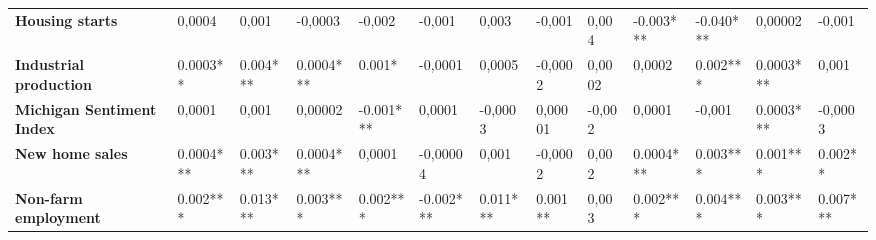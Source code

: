 \begin{landscape}
\begin{table}[]
{\begin{tabular}{@{}lllllllllllll@{}}
\textbf{Housing starts}           & 0,0004                                & 0,001                                 & -0,0003                               & -0,002                                & -0,001                                & 0,003                                 & -0,001                                & 0,004                                 & -0.003***                             & -0.040***                             & 0,00002                               & -0,001                                \\
\textbf{Industrial production}    & 0.0003**                              & 0.004***                              & 0.0004***                             & 0.001*                                & -0,0001                               & 0,0005                                & -0,0002                               & 0,0002                                & 0,0002                                & 0.002***                              & 0.0003***                             & 0,001                                 \\
\textbf{Michigan Sentiment Index} & 0,0001                                & 0,001                                 & 0,00002                               & -0.001***                             & 0,0001                                & -0,0003                               & 0,00001                               & -0,002                                & 0,0001                                & -0,001                                & 0.0003***                             & -0,0003                               \\
\textbf{New home sales}           & 0.0004***                             & 0.003***                              & 0.0004***                             & 0,0001                                & -0,00004                              & 0,001                                 & -0,0002                               & 0,002                                 & 0.0004***                             & 0.003***                              & 0.001***                              & 0.002**                               \\
\textbf{Non-farm employment}      & 0.002***                              & 0.013***                              & 0.003***                              & 0.002***                              & -0.002***                             & 0.011***                              & 0.001**                               & 0,003                                 & 0.002***                              & 0.004***                              & 0.003***                              & 0.007***                              \\

\end{tabular}}
\end{table}
\end{landscape}
